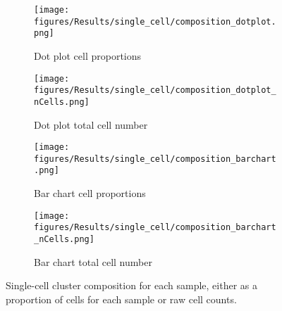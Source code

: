 \begin{figure}[pt]
\begin{subfigure}[t]{0.5\textwidth}
    \texttt{[image: figures/Results/single\_cell/composition\_dotplot.png]}
    \caption{Dot plot cell proportions}
    \label{fig:comp_dot}
\end{subfigure}
\begin{subfigure}[t]{0.5\textwidth}
    \texttt{[image: figures/Results/single\_cell/composition\_dotplot\_nCells.png]}
    \caption{Dot plot total cell number}
    \label{fig:comp_dot_ncells}
\end{subfigure}
%
\medskip
\begin{subfigure}[t]{0.5\textwidth}
    \texttt{[image: figures/Results/single\_cell/composition\_barchart.png]}
    \caption{Bar chart cell proportions}
    \label{fig:comp_bar}
\end{subfigure}
\begin{subfigure}[t]{0.5\textwidth}
    \texttt{[image: figures/Results/single\_cell/composition\_barchart\_nCells.png]}
    \caption{Bar chart total cell number}
    \label{fig:comp_bar_ncells}
\end{subfigure}
%
\caption[Single-cell cluster composition]{Single-cell cluster composition for each sample, either as a proportion of cells for each sample or raw cell counts.}
\label{fig:sc_comp_clusters}
\end{figure}
